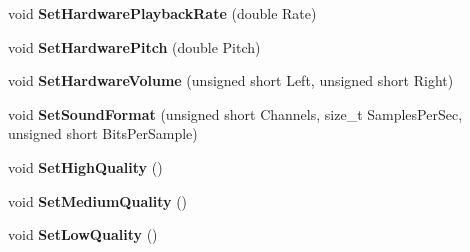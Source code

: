 \begin{DoxyCompactItemize}
\item 
\hypertarget{classcl_output_device_a4bd42b6b5b5b10e512a0ee0c42801384}{
void {\bfseries SetHardwarePlaybackRate} (double Rate)}
\label{classcl_output_device_a4bd42b6b5b5b10e512a0ee0c42801384}

\item 
\hypertarget{classcl_output_device_ad320529453aa4071908a6d6ba2ad2652}{
void {\bfseries SetHardwarePitch} (double Pitch)}
\label{classcl_output_device_ad320529453aa4071908a6d6ba2ad2652}

\item 
\hypertarget{classcl_output_device_a900bb0071030ae99c990b50f369abdde}{
void {\bfseries SetHardwareVolume} (unsigned short Left, unsigned short Right)}
\label{classcl_output_device_a900bb0071030ae99c990b50f369abdde}

\item 
\hypertarget{classcl_output_device_a63bd375c4960d087d6c3d2c4739dfbd5}{
void {\bfseries SetSoundFormat} (unsigned short Channels, size\_\-t SamplesPerSec, unsigned short BitsPerSample)}
\label{classcl_output_device_a63bd375c4960d087d6c3d2c4739dfbd5}

\item 
\hypertarget{classcl_output_device_aacd5ab363f542c3777ec2890c311b405}{
void {\bfseries SetHighQuality} ()}
\label{classcl_output_device_aacd5ab363f542c3777ec2890c311b405}

\item 
\hypertarget{classcl_output_device_a4be1b993a52294fa7f97b00e42f500a5}{
void {\bfseries SetMediumQuality} ()}
\label{classcl_output_device_a4be1b993a52294fa7f97b00e42f500a5}

\item 
\hypertarget{classcl_output_device_a789938bbc411754bd6443fce95bbc97c}{
void {\bfseries SetLowQuality} ()}
\label{classcl_output_device_a789938bbc411754bd6443fce95bbc97c}

\end{DoxyCompactItemize}
